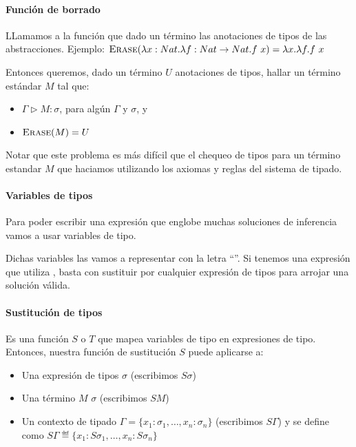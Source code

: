 \paragraph{Función de borrado}

LLamamos \erase{\cdot} a la función que dado un término  las anotaciones de tipos de las abstracciones. Ejemplo: $\textsc{Erase}(\lambda x:Nat.\lambda f:Nat\to Nat.f\ x) = \lambda x.\lambda f.f\ x$

Entonces queremos, dado un término $U$  anotaciones de tipos, hallar un término estándar $M$ tal que:
\begin{itemize}
  \item $\Gamma \rhd M : \sigma$, para algún $\Gamma$ y $\sigma$, y
  \item $\textsc{Erase}(M) = U$
\end{itemize}

Notar que este problema es más difícil que el chequeo de tipos para un término estandar $M$ que haciamos utilizando los axiomas y reglas del sistema de tipado.

\paragraph{Variables de tipos}

Para poder escribir una  expresión que englobe muchas soluciones de inferencia vamos a usar variables de tipo.

Dichas variables las vamos a representar con la letra ``''. Si tenemos una expresión que utiliza , basta con sustituir  por cualquier expresión de tipos para arrojar una solución válida.

\paragraph{Sustitución de tipos}

Es una función $S$ o $T$ que mapea variables de tipo en expresiones de tipo. Entonces, nuestra función de sustitución $S$ puede aplicarse a:
\begin{itemize}
  \item Una expresión de tipos $\sigma$ (escribimos $S\sigma$)
  \item Una término $M$ $\sigma$ (escribimos $SM$)
  \item Un contexto de tipado  $\Gamma = \{x_1:\sigma_1,\dots,x_n:\sigma_n\}$ (escribimos $S\Gamma$) y se define como $S\Gamma \eqdef \{x_1:S\sigma_1,\dots,x_n:S\sigma_n\}$
\end{itemize}

